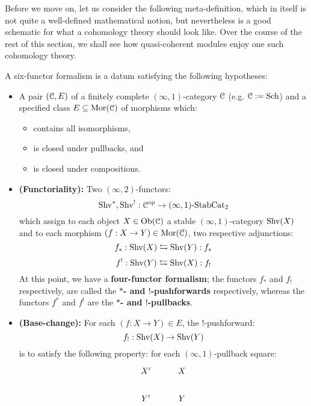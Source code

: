             Before we move on, let us consider the following meta-definition, which in itself is not quite a well-defined mathematical notion, but nevertheless is a good schematic for what a  cohomology theory should look like. Over the course of the rest of this section, we shall see how quasi-coherent modules enjoy one such cohomology theory.
            \begin{definition} \label{def: six_functor_formalisms}
                A six-functor formalism is a datum satisfying the following hypotheses:
                \begin{itemize}
                    \item A pair $(\C, E)$ of a finitely complete $(\infty, 1)$-category $\C$ (e.g. $\C := \Sch$) and a specified class $E \subseteq \Mor(\C)$ of morphisms which:
                    \begin{itemize}
                        \item contains all isomorphisms,
                        \item is closed under pullbacks, and
                        \item is closed under compositions.
                    \end{itemize}
                    \item \textbf{(Functoriality):} Two $(\infty, 2)$-functors:
                        $$\Shv^*, \Shv^!: \C^{\op} \to (\infty, 1)\-\Stab\Cat_2$$
                    which assign to each object $X \in \Ob(\C)$ a stable $(\infty, 1)$-category $\Shv(X)$ and to each morphism $(f: X \to Y) \in \Mor(\C)$, two respective adjunctions:
                        $$f_*: \Shv(X) \leftrightarrows \Shv(Y): f_*$$
                        $$f^!: \Shv(Y) \leftrightarrows \Shv(X): f_!$$
                    At this point, we have a \textbf{four-functor formalism}; the functors $f_*$ and $f_!$ respectively, are called the \textbf{$*$- and $!$-pushforwards} respectively, whereas the functors $f^*$ and $f^!$ are the \textbf{$*$- and $!$-pullbacks}. 
                    \item \textbf{(Base-change):} For each $(f: X \to Y) \in E$, the $!$-pushforward:
                        $$f_!: \Shv(X) \to \Shv(Y)$$
                    is to satisfy the following property: for each $(\infty, 1)$-pullback square:
                        $$
                            \begin{tikzcd}
                        	{X'} & X \\
                        	{Y'} & Y

\end{tikzcd}$$
\end{itemize}
\end{definition}
